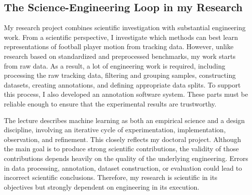 \subsection{The Science-Engineering Loop in my Research}

My research project combines scientific investigation with substantial engineering work. From a scientific perspective, I investigate which methods can best learn representations of football player motion from tracking data. However, unlike research based on standardized and preprocessed benchmarks, my work starts from raw data.
As a result, a lot of engineering work is required, including processing the raw tracking data, filtering and grouping samples, constructing datasets, creating annotations, and defining appropriate data splits. To support this process, I also developed an annotation software system. These parts must be reliable enough to ensure that the experimental results are trustworthy.

The lecture describes machine learning as both an empirical science and a design discipline, involving an iterative cycle of experimentation, implementation, observation, and refinement. This closely reflects my doctoral project. Although the main goal is to produce strong scientific contributions, the validity of those contributions depends heavily on the quality of the underlying engineering. Errors in data processing, annotation, dataset construction, or evaluation could lead to incorrect scientific conclusions. Therefore, my research is scientific in its objectives but strongly dependent on engineering in its execution.


